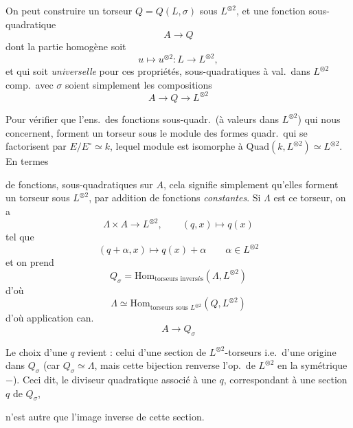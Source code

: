 \documentclass[11pt,a4paper]{article}
\begin{document}
On peut construire un torseur
$Q = Q(L,\sigma)$ sous $L^{\otimes 2}$, et une fonction sous-quadratique
\[
  A \longrightarrow Q
\]
dont la partie homogène soit
\[
  u \longmapsto u^{\otimes 2} : L \longrightarrow L^{\otimes 2},
\]
et qui soit \emph{universelle} pour ces propriétés,   sous-quadratiques à val.\ dans $L^{\otimes 2}$ comp.\ avec $\sigma$ soient simplement les compositions
\[
  A \longrightarrow Q \longrightarrow L^{\otimes 2}
\]

Pour vérifier \ill{} que l'ens.\ des fonctions sous-quadr.\ (à valeurs dans $L^{\otimes 2}$) qui nous concernent, forment un torseur sous le module des formes quadr.\ qui se factorisent par $E/E^{\circ} \simeq k$, lequel module est isomorphe à $\mathrm{Quad}(k, L^{\otimes 2}) \simeq L^{\otimes 2}$. En termes

de fonctions, sous-quadratiques sur $A$, cela signifie simplement qu'elles forment un torseur sous $L^{\otimes 2}$, par addition de fonctions \emph{constantes}. Si $\Lambda$ est ce torseur, on a
\[
  \Lambda \times A \longrightarrow L^{\otimes 2}, \qquad (q, x) \longmapsto q(x)
\]
tel que
\[
  (q + \alpha, x) \longmapsto q(x) + \alpha \qquad \alpha \in L^{\otimes 2}
\]
et on prend
\[
  Q_\sigma = \mathrm{Hom}_{\text{torseurs inversés}}(\Lambda, L^{\otimes 2})
\]
d'où
\[
  \Lambda \simeq \mathrm{Hom}_{\text{torseurs sous } L^{\otimes 2}}(Q, L^{\otimes 2})
\]
d'où  application can.
\[
  A \longrightarrow Q_\sigma
\]

 Le choix d'une $q$ \add{($\in \Lambda$)} revient : celui d'une section de $L^{\otimes 2}$-torseurs i.e.\ d'une origine dans $Q_\sigma$ (car $Q_\sigma \simeq \Lambda$, mais cette bijection renverse l'op.\ de $L^{\otimes 2}$ en la symétrique $-$). Ceci dit, le diviseur quadratique  associé à une $q$, correspondant à une section $q$ de $Q_\sigma$,

n'est autre que l'image inverse de cette section.
\end{document}
